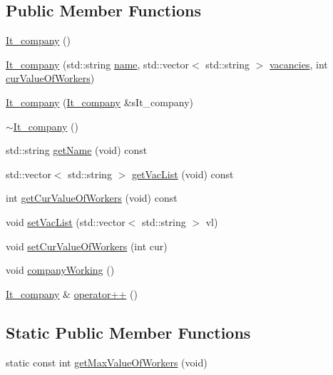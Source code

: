 \subsection*{Public Member Functions}
\begin{DoxyCompactItemize}
\item 
\hyperlink{class_it__company_a586ce8103147bcb474965fbe92b029ae}{It\+\_\+company} ()
\item 
\hyperlink{class_it__company_aef3374e7fe0caae3e395e18418200112}{It\+\_\+company} (std\+::string \hyperlink{class_it__company_a99894304639dab6b416f697dc7e81d52}{name}, std\+::vector$<$ std\+::string $>$ \hyperlink{main_8cpp_a5ea078e5bfa9aefe80362a0a1a33edce}{vacancies}, int \hyperlink{class_it__company_ac48dbef2db2cad83837c89efdc69b9c9}{cur\+Value\+Of\+Workers})
\item 
\hyperlink{class_it__company_adbd662e9e7bc67642283301274a9326b}{It\+\_\+company} (\hyperlink{class_it__company}{It\+\_\+company} \&s\+It\+\_\+company)
\item 
\hyperlink{class_it__company_abea4fe4b9e6229c4b7e84881cf124975}{$\sim$\+It\+\_\+company} ()
\item 
std\+::string \hyperlink{class_it__company_a83fff670c4a7271486f9632db1bf4d77}{get\+Name} (void) const
\item 
std\+::vector$<$ std\+::string $>$ \hyperlink{class_it__company_a292596bb863a09f2983cb955979a8bb9}{get\+Vac\+List} (void) const
\item 
int \hyperlink{class_it__company_aadb84a911a10ad83f6e9a84558a1d4df}{get\+Cur\+Value\+Of\+Workers} (void) const
\item 
void \hyperlink{class_it__company_a079be9a566c94860e31acdb0c2953536}{set\+Vac\+List} (std\+::vector$<$ std\+::string $>$ vl)
\item 
void \hyperlink{class_it__company_ae06d651e9611d19f02bc1c7f29f2e988}{set\+Cur\+Value\+Of\+Workers} (int cur)
\item 
void \hyperlink{class_it__company_a57d8e8056fb6753cef0a6acd80a801dd}{company\+Working} ()
\item 
\hyperlink{class_it__company}{It\+\_\+company} \& \hyperlink{class_it__company_ae83add85a00be1e24cdce48aa72678de}{operator++} ()
\end{DoxyCompactItemize}
\subsection*{Static Public Member Functions}
\begin{DoxyCompactItemize}
\item 
static const int \hyperlink{class_it__company_a11e4104cfd2c51f89f9d10b290c8eaaa}{get\+Max\+Value\+Of\+Workers} (void)
\end{DoxyCompactItemize}
